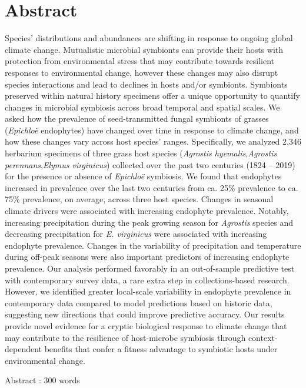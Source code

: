 \documentclass[11pt]{article}
\begin{document}
	\section*{Abstract}
Species' distributions and abundances are shifting in response to ongoing global climate change. 
Mutualistic microbial symbionts can provide their hosts with protection from environmental stress that may contribute towards resilient responses to environmental change, however these changes may also disrupt species interactions and lead to declines in hosts and/or symbionts.
Symbionts preserved within natural history specimens offer a unique opportunity to quantify changes in microbial symbiosis across broad temporal and spatial scales. 
We asked how the prevalence of seed-transmitted fungal symbionts of grasses (\emph{Epichloë} endophytes) have changed over time in response to climate change, and how these changes vary across host species' ranges.
Specifically, we analyzed 2,346 herbarium specimens of three grass host species (\emph{Agrostis hyemalis},\emph{Agrostis perennans},\emph{Elymus virginicus}) collected over the past two centuries (1824 -- 2019) for the presence or absence of \emph{Epichloë} symbiosis. 
We found that endophytes increased in prevalence over the last two centuries from ca. 25\% prevalence to ca. 75\% prevalence, on average, across three host species.
Changes in seasonal climate drivers were associated with increasing endophyte prevalence. 
Notably, increasing precipitation during the peak growing season for \emph{Agrostis} species and decreasing precipitation for \emph{E. virginicus} were associated with increasing endophyte prevalence.
Changes in the variability of precipitation and temperature during off-peak seasons were also important predictors of increasing endophyte prevalence. 
Our analysis performed favorably in an out-of-sample predictive test with contemporary survey data, a rare extra step in collections-based research.
However, we identified greater local-scale variability in endophyte prevalence in contemporary data compared to model predictions based on historic data, suggesting new directions that could improve predictive accuracy.
Our results provide novel evidence for a cryptic biological response to climate change that may contribute to the resilience of host-microbe symbiosis through context-dependent benefits that confer a fitness advantage to symbiotic hosts under environmental change. 

Abstract : 300 words
	
	\newpage{}
	
\end{document}

